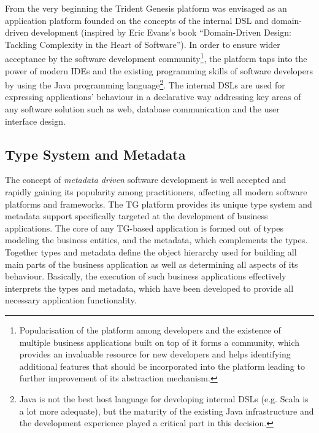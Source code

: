   From the very beginning the Trident Genesis platform was envisaged as an application platform founded on the concepts of the internal DSL and domain-driven development (inspired by Eric Evans's book ``Domain-Driven Design: Tackling Complexity in the Heart of Software'').
  In order to ensure wider acceptance by the software development community\footnote{Popularisation of the platform among developers and the existence of multiple business applications built on top of it forms a community, which provides an invaluable resource for new developers and helps identifying additional features that should be incorporated into the platform leading to further improvement of its abstraction mechanism.}, the platform taps into the power of modern IDEs and the existing programming skills of software developers by using the Java programming language\footnote{Java is not the best host language for developing internal DSLs (e.g. Scala is a lot more adequate), but the maturity of the existing Java infrastructure and the development experience played a critical part in this decision.}.
  The internal DSLs are used for expressing applications' behaviour in a declarative way addressing key areas of any software solution such as web, database communication and the user interface design.

\subsection{Type System and Metadata}
  The concept of \emph{metadata driven} software development is well accepted and rapidly gaining its popularity among practitioners, affecting all modern software platforms and frameworks.
  The TG platform provides its unique type system and metadata support specifically targeted at the development of business applications.
  The core of any TG-based application is formed out of types modeling the business entities, and the metadata, which complements the types.
  Together types and metadata define the object hierarchy used for building all main parts of the business application as well as determining all aspects of its behaviour.
  Basically, the execution of such business applications effectively interprets the types and metadata, which have been developed to provide all necessary application functionality.
 
